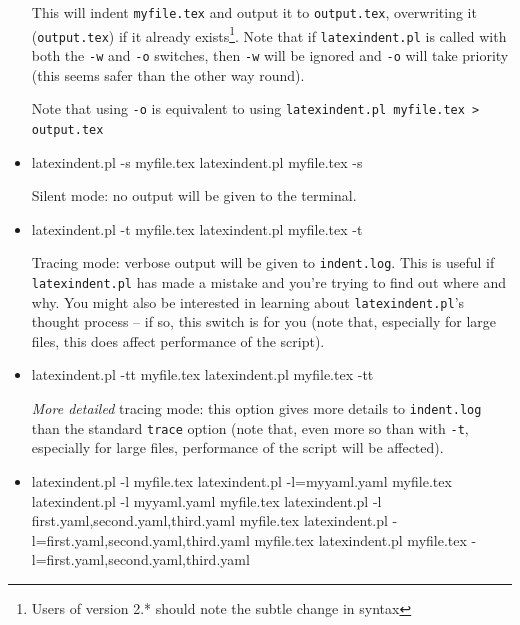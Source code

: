 \documentclass[8pt]{article}
\newcommand{\verbitem}[1]{\small\PVerb{#1}}
\begin{document}
\begin{itemize}[labelsep=.25cm]
	      This will indent \texttt{myfile.tex} and output it to \texttt{output.tex},
          overwriting it (\texttt{output.tex}) if it already exists\footnote{Users of version 2.* should 
          note the subtle change in syntax}. Note that if \texttt{latexindent.pl} is called with both
	      the \texttt{-w} and \texttt{-o} switches, then \texttt{-w} will
	      be ignored and \texttt{-o} will take priority (this seems safer than the
	      other way round).

	      Note that using \texttt{-o} is equivalent to using \texttt{latexindent.pl myfile.tex > output.tex}
	\item[\verbitem{-s, --silent}] 
      \begin{commandshell}
latexindent.pl -s myfile.tex
latexindent.pl myfile.tex -s
      \end{commandshell}

	      Silent mode: no output will be given to the terminal.
	\item[\verbitem{-t, --trace}] 
      \begin{commandshell}
latexindent.pl -t myfile.tex
latexindent.pl myfile.tex -t
      \end{commandshell}

	      \label{page:traceswitch}
	      Tracing mode: verbose output will be given to \texttt{indent.log}. This
	      is useful if \texttt{latexindent.pl} has made a mistake and you're
	      trying to find out where and why. You might also be interested in learning
	      about \texttt{latexindent.pl}'s thought process -- if so, this
	      switch is for you (note that, especially for large files, this does affect
          performance of the script).
	\item[\verbitem{-tt, --ttrace}] 
      \begin{commandshell}
latexindent.pl -tt myfile.tex
latexindent.pl myfile.tex -tt
      \end{commandshell}

      \emph{More detailed} tracing mode: this option gives more details to \texttt{indent.log}
      than the standard \texttt{trace} option (note that, even more so than with \texttt{-t}, 
      especially for large files, performance of the script will be affected).
	\item[\verbitem{-l, --local[=myyaml.yaml]}] 
      \begin{commandshell}
latexindent.pl -l myfile.tex
latexindent.pl -l=myyaml.yaml myfile.tex
latexindent.pl -l myyaml.yaml myfile.tex
latexindent.pl -l first.yaml,second.yaml,third.yaml myfile.tex
latexindent.pl -l=first.yaml,second.yaml,third.yaml myfile.tex
latexindent.pl myfile.tex -l=first.yaml,second.yaml,third.yaml 
      \end{commandshell}


\end{itemize}
\end{document}
